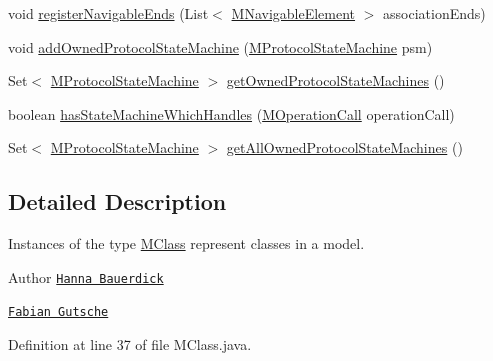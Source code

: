 \begin{DoxyCompactItemize}
\item 
void \hyperlink{interfaceorg_1_1tzi_1_1use_1_1uml_1_1mm_1_1_m_class_a292397f54f8bde0eb73bc8e45be40c28}{register\-Navigable\-Ends} (List$<$ \hyperlink{interfaceorg_1_1tzi_1_1use_1_1uml_1_1mm_1_1_m_navigable_element}{M\-Navigable\-Element} $>$ association\-Ends)
\item 
void \hyperlink{interfaceorg_1_1tzi_1_1use_1_1uml_1_1mm_1_1_m_class_a4bbaf3d3b614e825f813b77630238032}{add\-Owned\-Protocol\-State\-Machine} (\hyperlink{classorg_1_1tzi_1_1use_1_1uml_1_1mm_1_1statemachines_1_1_m_protocol_state_machine}{M\-Protocol\-State\-Machine} psm)
\item 
Set$<$ \hyperlink{classorg_1_1tzi_1_1use_1_1uml_1_1mm_1_1statemachines_1_1_m_protocol_state_machine}{M\-Protocol\-State\-Machine} $>$ \hyperlink{interfaceorg_1_1tzi_1_1use_1_1uml_1_1mm_1_1_m_class_ac93604672d534a4f352f9b20ad1920d3}{get\-Owned\-Protocol\-State\-Machines} ()
\item 
boolean \hyperlink{interfaceorg_1_1tzi_1_1use_1_1uml_1_1mm_1_1_m_class_aaf1a1b26915812f26cf7b413f372da7e}{has\-State\-Machine\-Which\-Handles} (\hyperlink{classorg_1_1tzi_1_1use_1_1uml_1_1sys_1_1_m_operation_call}{M\-Operation\-Call} operation\-Call)
\item 
Set$<$ \hyperlink{classorg_1_1tzi_1_1use_1_1uml_1_1mm_1_1statemachines_1_1_m_protocol_state_machine}{M\-Protocol\-State\-Machine} $>$ \hyperlink{interfaceorg_1_1tzi_1_1use_1_1uml_1_1mm_1_1_m_class_a494de797c215df4eff99cb4ee698fa8b}{get\-All\-Owned\-Protocol\-State\-Machines} ()
\end{DoxyCompactItemize}


\subsection{Detailed Description}
Instances of the type \hyperlink{interfaceorg_1_1tzi_1_1use_1_1uml_1_1mm_1_1_m_class}{M\-Class} represent classes in a model.

\begin{DoxyAuthor}{Author}
\href{mailto:hanna@tzi.de}{\tt Hanna Bauerdick} 

\href{mailto:gutsche@tzi.de}{\tt Fabian Gutsche} 
\end{DoxyAuthor}


Definition at line 37 of file M\-Class.\-java.




